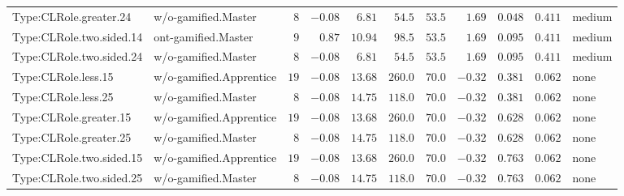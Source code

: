 \documentclass[6pt,a4paper]{article}
\begin{document}
{\begin{longtable}{llrrrrrrrrl}
Type:CLRole.greater.24&w/o-gamified.Master&$ 8$&$-0.08$&$ 6.81$&$ 54.5$&$ 53.5$&$ 1.69$&$0.048$&$0.411$&medium\tabularnewline
Type:CLRole.two.sided.14&ont-gamified.Master&$ 9$&$ 0.87$&$10.94$&$ 98.5$&$ 53.5$&$ 1.69$&$0.095$&$0.411$&medium\tabularnewline
Type:CLRole.two.sided.24&w/o-gamified.Master&$ 8$&$-0.08$&$ 6.81$&$ 54.5$&$ 53.5$&$ 1.69$&$0.095$&$0.411$&medium\tabularnewline
Type:CLRole.less.15&w/o-gamified.Apprentice&$19$&$-0.08$&$13.68$&$260.0$&$ 70.0$&$-0.32$&$0.381$&$0.062$&none\tabularnewline
Type:CLRole.less.25&w/o-gamified.Master&$ 8$&$-0.08$&$14.75$&$118.0$&$ 70.0$&$-0.32$&$0.381$&$0.062$&none\tabularnewline
Type:CLRole.greater.15&w/o-gamified.Apprentice&$19$&$-0.08$&$13.68$&$260.0$&$ 70.0$&$-0.32$&$0.628$&$0.062$&none\tabularnewline
Type:CLRole.greater.25&w/o-gamified.Master&$ 8$&$-0.08$&$14.75$&$118.0$&$ 70.0$&$-0.32$&$0.628$&$0.062$&none\tabularnewline
\newpage
Type:CLRole.two.sided.15&w/o-gamified.Apprentice&$19$&$-0.08$&$13.68$&$260.0$&$ 70.0$&$-0.32$&$0.763$&$0.062$&none\tabularnewline
Type:CLRole.two.sided.25&w/o-gamified.Master&$ 8$&$-0.08$&$14.75$&$118.0$&$ 70.0$&$-0.32$&$0.763$&$0.062$&none\tabularnewline
\hline
\end{longtable}}
\end{document}
